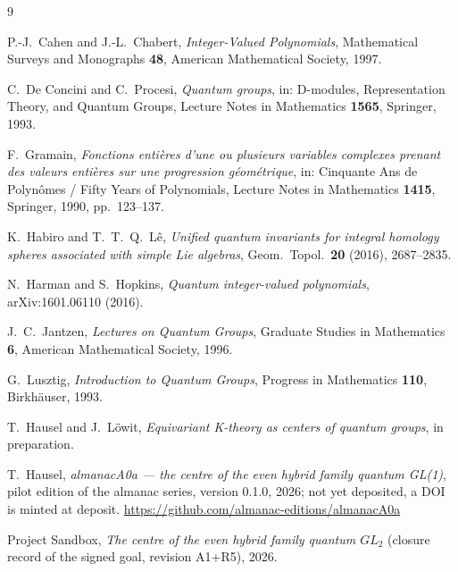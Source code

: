 \documentclass[11pt]{article}
\begin{document}
\begin{thebibliography}{9}

P.-J.~Cahen and J.-L.~Chabert,
\emph{Integer-Valued Polynomials},
Mathematical Surveys and Monographs \textbf{48}, American Mathematical Society, 1997.

C.~De Concini and C.~Procesi,
\emph{Quantum groups},
in: D-modules, Representation Theory, and Quantum Groups,
Lecture Notes in Mathematics \textbf{1565}, Springer, 1993.

F.~Gramain,
\emph{Fonctions enti\`eres d'une ou plusieurs variables complexes prenant des valeurs enti\`eres
sur une progression g\'eom\'etrique},
in: Cinquante Ans de Polyn\^omes / Fifty Years of Polynomials,
Lecture Notes in Mathematics \textbf{1415}, Springer, 1990, pp.~123--137.

K.~Habiro and T.~T.~Q.~L\^e,
\emph{Unified quantum invariants for integral homology spheres associated with simple Lie
algebras},
Geom.\ Topol.\ \textbf{20} (2016), 2687--2835.

N.~Harman and S.~Hopkins,
\emph{Quantum integer-valued polynomials},
arXiv:1601.06110 (2016).

J.~C.~Jantzen,
\emph{Lectures on Quantum Groups},
Graduate Studies in Mathematics \textbf{6}, American Mathematical Society, 1996.

G.~Lusztig,
\emph{Introduction to Quantum Groups},
Progress in Mathematics \textbf{110}, Birkh\"auser, 1993.

T.~Hausel and J.~L\"owit,
\emph{Equivariant K-theory as centers of quantum groups}, in preparation.

T.~Hausel, \emph{almanacA0a --- the centre of the even hybrid family quantum GL(1)},
pilot edition of the almanac series, version 0.1.0, 2026; not yet deposited, a DOI is
minted at deposit.
\url{https://github.com/almanac-editions/almanacA0a}

Project Sandbox,
\emph{The centre of the even hybrid family quantum $GL_2$}
(closure record of the signed goal, revision A1+R5), 2026.

\end{thebibliography}
\end{document}
